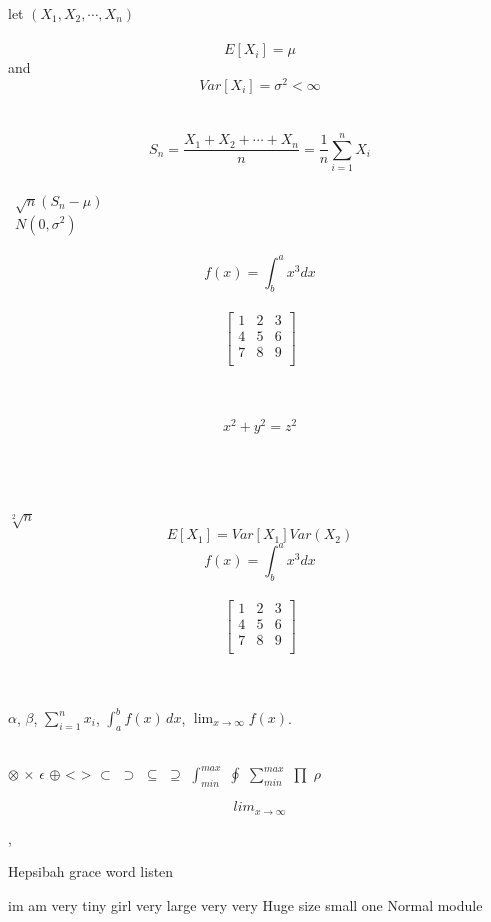 \documentclass{article}
\begin{document}
	
	let $(X_1, X_2,\cdots, X_n)$ \\\\
	\[E[X_i] = \mu\] and \[Var[X_i] = \sigma^2<\infty\] \\\
	\[S_n = \frac{X_1+X_2+\cdots+X_n}{n} = \frac{1}{n}\sum_{i=1}^{n} X_i\] \\\
    $\sqrt{n}(S_n-\mu)$ \\\
    $N(0,\sigma^2)$ \\\
    	\[f(x) = \int^a_b x^3 dx\]  \\
    \[
    \begin{bmatrix}
    	1 & 2 & 3 \\
    	4 & 5 & 6 \\
    	7 & 8 & 9 \\
    \end{bmatrix}
    \]   \\\
    
     	\[x^2 + y^2 = z^2\]\\\\\\\\
    $\sqrt[2]{n}$ \\
    \[E[X_1] = Var[X_1] Var(X_2)\]
    \[f(x) = \int^a_b x^3 dx\]  \\
    \[
    \begin{bmatrix}
    	1 & 2 & 3 \\
    	4 & 5 & 6 \\
    	7 & 8 & 9 \\
    \end{bmatrix}
    \]  \\\
    
    $\alpha$, $\beta$, $\sum_{i=1}^{n} x_i$,
    $\int_{a}^{b} f(x) \, dx$, $\lim_{x \to \infty} f(x)$.  \\\
    
    $\otimes$ 
    $\times$ 
    $\epsilon$  $\oplus$   < > $\subset$  $\supset$ $\subseteq$   $\supseteq$ $\int_{min}^{max}$
    $\oint$  $\sum_{min}^{max}$  $\prod$  $\rho$
    
    
    \[lim_{x \to \infty}\]
    
    \cite{aggarwal2005software},
    
    
    
    \hspace{2cm}Hepsibah grace word listen
    
    \tiny im am very tiny girl
    \large  very large
    \LARGE very very 
    \huge Huge size 
    \small small one
    \normalsize Normal module
    
    
    
\end{document}
